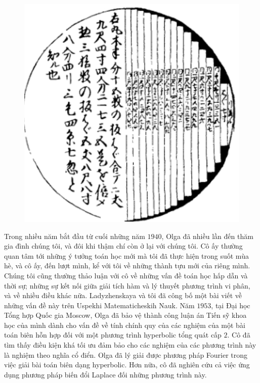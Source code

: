\begin{multicols}{2}
\begin{figure}[H]
		\includegraphics[width= 0.9\linewidth]{1}
		\vspace*{-5pt}
	\end{figure}
	Trong nhiều năm bắt đầu từ cuối những năm $1940$, Olga đã nhiều lần đến thăm gia đình chúng tôi, và đôi khi thậm chí còn ở lại với chúng tôi. Cô ấy thường quan tâm tới những ý tưởng toán học mới mà tôi đã thực hiện trong suốt mùa hè, và cô ấy, đến lượt mình,  kể với tôi về những thành tựu mới của riêng mình. Chúng tôi cũng thường thảo luận với cô về những vấn đề toán học  hấp dẫn và thời sự; những sự kết nối giữa giải tích hàm và lý thuyết phương trình vi phân, và về nhiều điều khác nữa. Ladyzhenskaya và tôi đã công bố một bài viết về những vấn đề này trên Uspekhi Matematicheskih Nauk.
	\vskip 0.1cm
	Năm $1953$, tại Đại học Tổng hợp Quốc gia Moscow, Olga đã bảo vệ thành công luận án  Tiến sỹ khoa học của mình dành cho vấn đề về  tính chính quy của các nghiệm của một bài toán  biên hỗn hợp đối với một phương trình hyperbolic tổng quát cấp $2$. Cô đã tìm thấy điều kiện khá tối ưu đảm bảo cho các nghiệm của các phương trình này là nghiệm theo  nghĩa cổ điển. Olga đã  lý giải được phương pháp Fourier trong việc giải bài toán biên dạng hyperbolic. Hơn nữa, cô đã nghiên cứu cả việc ứng dụng phương pháp biến đổi Laplace đối  những phương trình này.  
	\vskip 0.1cm

\end{multicols}
